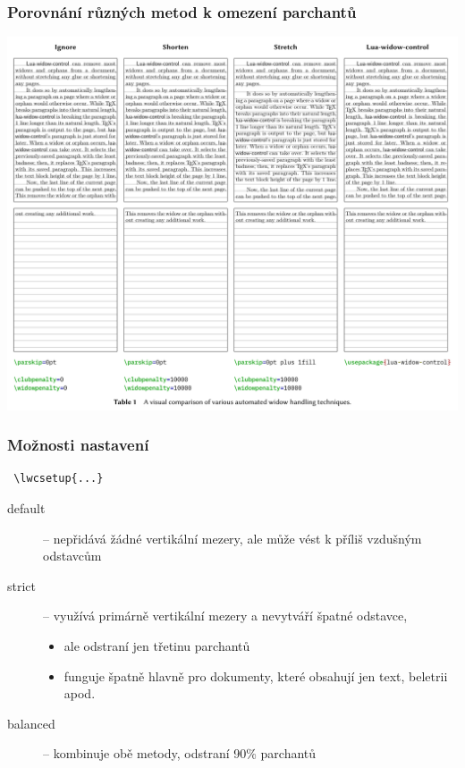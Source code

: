 \begin{frame}
  \frametitle{Porovnání různých metod k omezení parchantů}
  \begin{priklad}
  \begin{center}
  \includegraphics[height=.95\textheight]{img/lua-widow.pdf}
  \end{center}
\end{priklad}
\end{frame}

\begin{frame}[fragile]
  \frametitle{Možnosti nastavení}
 \begin{verbatim}
 \lwcsetup{...}
 \end{verbatim}
 \begin{description}
   \item[default] -- nepřidává žádné vertikální mezery, ale může vést k příliš vzdušným odstavcům
   \item[strict] -- využívá primárně vertikální mezery a nevytváří špatné odstavce,  
     \begin{itemize}
       \item ale odstraní jen třetinu parchantů
        \item funguje špatně hlavně pro dokumenty, které obsahují jen text, beletrii apod.
      \end{itemize}
    \item[balanced] -- kombinuje obě metody, odstraní 90\% parchantů
  \end{description}
\end{frame}

